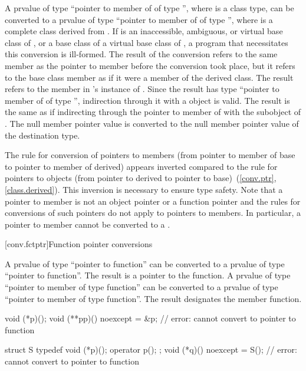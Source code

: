 \pnum
A prvalue of type ``pointer to member of  of type \cv{}
'', where  is a class type, can be converted to
a prvalue of type ``pointer to member of  of type \cv{}
'', where  is a complete class derived
from . If  is an
inaccessible,
ambiguous, or virtual base
class of , or a base class of a virtual base class of
, a program that necessitates this conversion is ill-formed.
The result of the conversion refers to the same member as the pointer to
member before the conversion took place, but it refers to the base class
member as if it were a member of the derived class. The result refers to
the member in 's instance of . Since the result has
type ``pointer to member of  of type \cv{} '',
indirection through it with a  object is valid. The result is the same
as if indirecting through the pointer to member of  with the
 subobject of . The null member pointer value is
converted to the null member pointer value of the destination
type.
\begin{footnote}
The rule for conversion of pointers to members (from pointer to member
of base to pointer to member of derived) appears inverted compared to
the rule for pointers to objects (from pointer to derived to pointer to
base)~(\ref{conv.ptr}, \ref{class.derived}). This inversion is
necessary to ensure type safety. Note that a pointer to member is not
an object pointer or a function pointer
and the rules for conversions
of such pointers do not apply to pointers to members.
%
In particular, a pointer to member cannot be converted to a
.
\end{footnote}

[conv.fctptr]{Function pointer conversions}

\pnum
{}%
A prvalue of type ``pointer to  function''
can be converted to a prvalue of type ``pointer to function''.
The result is a pointer to the function.
A prvalue of type ``pointer to member of type  function''
can be converted to a prvalue of type ``pointer to member of type function''.
The result designates the member function.

\begin{example}
\begin{codeblock}
void (*p)();
void (**pp)() noexcept = &p;    // error: cannot convert to pointer to  function

struct S { typedef void (*p)(); operator p(); };
void (*q)() noexcept = S();     // error: cannot convert to pointer to  function
\end{codeblock}
\end{example}

